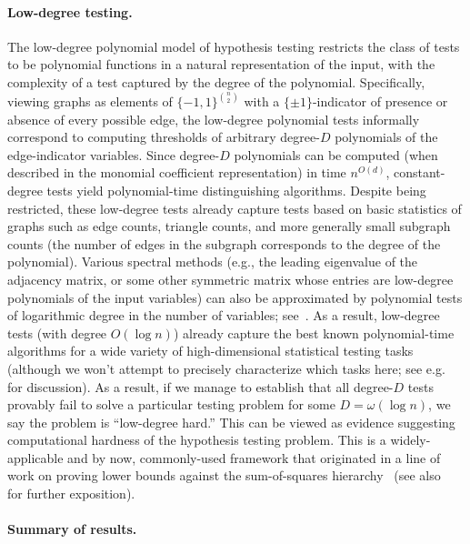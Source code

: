 \documentclass{article}
\begin{document}
\paragraph{Low-degree testing.} The low-degree polynomial model of hypothesis testing restricts the class of tests to be  polynomial functions in a natural representation of the input, with the complexity of a test captured by the degree of the polynomial. Specifically, viewing graphs as elements of $\{-1,1\}^{{n \choose 2}}$ with a $\{\pm 1\}$-indicator of presence or absence of every possible edge, the low-degree polynomial tests informally correspond to computing thresholds of arbitrary degree-$D$ polynomials of the edge-indicator variables. Since degree-$D$ polynomials can be computed (when described in the monomial coefficient representation) in time $n^{O(d)}$, constant-degree tests yield polynomial-time distinguishing algorithms. Despite being restricted, these low-degree tests already capture tests based on basic statistics of graphs such as edge counts, triangle counts, and more generally small subgraph counts (the number of edges in the subgraph corresponds to the degree of the polynomial). Various spectral methods (e.g., the leading eigenvalue of the adjacency matrix, or some other symmetric matrix whose entries are low-degree polynomials of the input variables) can also be approximated by polynomial tests of logarithmic degree in the number of variables; see~\cite[Section~4.2.3]{ld-notes}. As a result, low-degree tests (with degree $O(\log n)$) already capture the best known polynomial-time algorithms for a wide variety of high-dimensional statistical testing tasks (although we won't attempt to precisely characterize which tasks here; see e.g.~\cite{sos-detecting,hopkins-thesis,ld-notes,ld-counterexamples,lll} for discussion). As a result, if we manage to establish that all degree-$D$ tests provably fail to solve a particular testing problem for some $D = \omega(\log n)$, we say the problem is ``low-degree hard.'' This can be viewed as evidence suggesting computational hardness of the hypothesis testing problem. This is a widely-applicable and by now, commonly-used framework that originated in a line of work on proving lower bounds against the sum-of-squares hierarchy~\cite{BHKK+16,HS-bayesian,sos-detecting} (see also~\cite{hopkins-thesis,ld-notes} for further exposition). 






\paragraph{Summary of results.}
\end{document}
